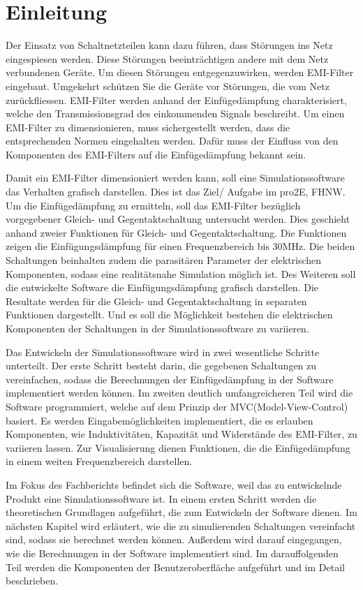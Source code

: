 \section{Einleitung} \label{sec:einleitung}
Der Einsatz von Schaltnetzteilen kann dazu führen, dass Störungen ins Netz eingespiesen werden. Diese Störungen beeinträchtigen andere mit dem Netz verbundenen Geräte. Um diesen Störungen entgegenzuwirken, werden EMI-Filter eingebaut. Umgekehrt schützen Sie die Geräte vor Störungen, die vom Netz zurückfliessen. EMI-Filter werden anhand der Einfügedämpfung charakterisiert, welche den Transmissionsgrad des einkommenden Signals beschreibt. Um einen EMI-Filter zu dimensionieren, muss sichergestellt werden, dass die entsprechenden Normen eingehalten werden. Dafür muss der Einfluss von den Komponenten des EMI-Filters auf die Einfügedämpfung bekannt sein. 

Damit ein EMI-Filter dimensioniert werden kann, soll eine Simulationssoftware das Verhalten grafisch darstellen. Dies ist das Ziel/ Aufgabe im pro2E, FHNW. Um die Einfügedämpfung zu ermitteln, soll das EMI-Filter bezüglich vorgegebener Gleich- und Gegentaktschaltung untersucht werden. Dies geschieht anhand zweier Funktionen für Gleich- und Gegentaktschaltung. Die Funktionen zeigen die Einfügungsdämpfung für einen Frequenzbereich bis 30MHz. Die beiden Schaltungen beinhalten zudem die parasitären Parameter der elektrischen Komponenten, sodass eine realitätsnahe Simulation möglich ist. Des Weiteren soll die entwickelte Software die Einfügungsdämpfung grafisch darstellen. Die Resultate werden für die Gleich- und Gegentaktschaltung in separaten Funktionen dargestellt. Und es soll die Möglichkeit bestehen die elektrischen Komponenten der Schaltungen in der Simulationssoftware zu variieren.

Das Entwickeln der Simulationssoftware wird in zwei wesentliche Schritte unterteilt. Der erste Schritt besteht darin, die gegebenen Schaltungen zu vereinfachen, sodass die Berechnungen der Einfügedämpfung in der Software implementiert werden können. Im zweiten deutlich umfangreicheren Teil wird die Software programmiert, welche auf dem Prinzip der MVC(Model-View-Control) basiert. Es werden Eingabemöglichkeiten implementiert, die es erlauben Komponenten, wie Induktivitäten, Kapazität und Widerstände des EMI-Filter, zu variieren lassen. Zur Visualisierung dienen Funktionen, die die Einfügedämpfung in einem weiten Frequenzbereich darstellen.

Im Fokus des Fachberichts befindet sich die Software, weil das zu entwickelnde Produkt eine Simulationssoftware ist. In einem ersten Schritt werden die theoretischen Grundlagen aufgeführt, die zum Entwickeln der Software dienen. Im nächsten Kapitel wird erläutert, wie die zu simulierenden Schaltungen vereinfacht sind, sodass sie berechnet werden können. Außerdem wird darauf eingegangen, wie die Berechnungen in der Software implementiert sind. Im darauffolgenden Teil werden die Komponenten der Benutzeroberfläche aufgeführt und im Detail beschrieben.

